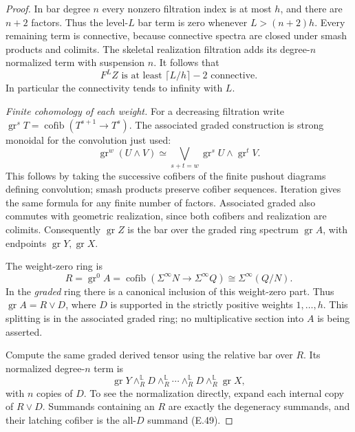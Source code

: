 \begin{proof}
In bar degree $n$ every nonzero filtration index is at most $h$,
and there are $n+2$ factors.  Thus the level-$L$ bar term is zero
whenever $L>(n+2)h$.  Every remaining term is connective, because
connective spectra are closed under smash products and colimits.
The skeletal realization filtration adds its degree-$n$ normalized
term with suspension $n$.  It follows that
\[
 F^LZ\text{ is at least }\lceil L/h\rceil-2
       \text{ connective}.                           \tag{E.46}
\]
In particular the connectivity tends to infinity with $L$.

\emph{Finite cohomology of each weight.}
For a decreasing filtration write
$\operatorname{gr}^s T=\operatorname{cofib}(T^{s+1}\to T^s)$.
The associated graded construction is strong monoidal for the
convolution just used:
\[
 \operatorname{gr}^w(U\wedge V)
 \simeq\bigvee_{s+t=w}
        \operatorname{gr}^sU\wedge\operatorname{gr}^tV. \tag{E.47}
\]
This follows by taking the successive cofibers of the finite
pushout diagrams defining convolution; smash products preserve
cofiber sequences.  Iteration gives the same formula for any
finite number of factors.  Associated graded also commutes with
geometric realization, since both cofibers and realization are
colimits.  Consequently $\operatorname{gr}Z$ is the bar over the
graded ring spectrum $\operatorname{gr}A$, with endpoints
$\operatorname{gr}Y,\operatorname{gr}X$.

The weight-zero ring is
\[
 R=\operatorname{gr}^0A
   =\operatorname{cofib}(\Sigma^\infty N\to\Sigma^\infty Q)
   \cong\Sigma^\infty(Q/N).                           \tag{E.48}
\]
In the \emph{graded} ring there is a canonical inclusion of this
weight-zero part.  Thus $\operatorname{gr}A=R\vee D$, where $D$
is supported in the strictly positive weights $1,\ldots,h$.
This splitting is in the associated graded ring; no multiplicative
section into $A$ is being asserted.

Compute the same graded derived tensor using the relative bar
over $R$.  Its normalized degree-$n$ term is
\[
 \operatorname{gr}Y\wedge_R^{\mathbb L}
      D\wedge_R^{\mathbb L}\cdots\wedge_R^{\mathbb L}D
      \wedge_R^{\mathbb L}\operatorname{gr}X,           \tag{E.49}
\]
with $n$ copies of $D$.  To see the normalization directly, expand
each internal copy of $R\vee D$.  Summands containing an $R$ are
exactly the degeneracy summands, and their latching cofiber is
the all-$D$ summand (E.49).


\end{proof}
